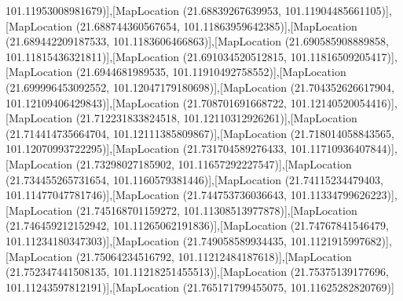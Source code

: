 101.11953008981679)],[MapLocation (21.68839267639953, 101.11904485661105)],[MapLocation (21.688744360567654, 101.11863959642385)],[MapLocation (21.689442209187533, 101.1183606466863)],[MapLocation (21.690585908889858, 101.11815436321811)],[MapLocation (21.691034520512815, 101.11816509205417)],[MapLocation (21.6944681989535, 101.11910492758552)],[MapLocation (21.699996453092552, 101.12047179180698)],[MapLocation (21.704352626617904, 101.12109406429843)],[MapLocation (21.708701691668722, 101.12140520054416)],[MapLocation (21.712231833824518, 101.12110312926261)],[MapLocation (21.714414735664704, 101.12111385809867)],[MapLocation (21.718014058843565, 101.12070993722295)],[MapLocation (21.731704589276433, 101.11710936407844)],[MapLocation (21.73298027185902, 101.11657292227547)],[MapLocation (21.734455265731654, 101.1160579381446)],[MapLocation (21.74115234479403, 101.11477047781746)],[MapLocation (21.744753736036643, 101.11334799626223)],[MapLocation (21.745168701159272, 101.11308513977878)],[MapLocation (21.746459212152942, 101.11265062191836)],[MapLocation (21.74767841546479, 101.11234180347303)],[MapLocation (21.749058589934435, 101.1121915997682)],[MapLocation (21.75064234516792, 101.11212484187618)],[MapLocation (21.752347441508135, 101.11218251455513)],[MapLocation (21.75375139177696, 101.11243597812191)],[MapLocation (21.765171799455075, 101.11625282820769)]